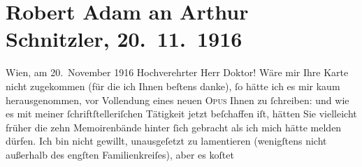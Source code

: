 

         
         \renewcommand{\erwaehntePersonen}{Personen: Peter Gast, Max Kemmerich, Friedrich Nietzsche, Romain Rolland}
         \renewcommand{\erwaehnteInstitutionen}{Institutionen: Nobelpreis}
         \renewcommand{\erwaehnteOrte}{Orte: Frankreich, Wien, XII., Meidling}
         \renewcommand{\erwaehnteWerke}{Werke: Jean Christophe, Meine Memoiren, Märchenkomödie, Prophezeiungen – Wahn oder Wirklichkeit?, Wilhelm Meister, Wundervogel}
               \section[Robert Adam an Arthur Schnitzler, 20. 11. 1916]{ Robert Adam an Arthur Schnitzler, 20. 11. 1916}\nopagebreak{}\rehead{ }\begin{ledgroupsized}[t]{13cm}\normalsize\beginnumbering \toendnotes[C]{\smallbreak\pagebreak[2]} 
\toendnotes[C]{\smallbreak}\pstart
           \raggedleft{}{\pb}Wien, am 20. November 1916\pend
           \pstart{}Hochverehrter Herr Doktor!\pend\pstart
           Wäre mir Ihre Karte nicht zugekommen (für die ich Ihnen beſtens danke), ſo hätte ich
               es mir kaum herausgenommen, vor Vollendung eines neuen \textsc{Opus}
               Ihnen zu ſchreiben: und wie es mit meiner ſchriftſtelleriſchen Tätigkeit jetzt
               beſchaffen iſt,  hätten Sie vielleicht früher die
               zehn Memoirenbände hinter ſich
               gebracht als ich mich hätte melden dürfen. Ich bin nicht gewillt, unausgeſetzt zu
               lamentieren (wenigſtens nicht außerhalb des engſten Familienkreiſes), aber es koſtet

\end{ledgroupsized}

